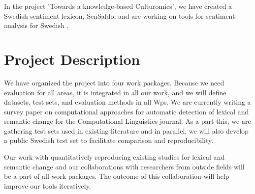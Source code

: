 \documentclass[12pt,twoside,a4paper]{article}
\begin{document}
	 
	In the project 'Towards a knowledge-based Culturomics', we have created a Swedish sentiment lexicon, SenSaldo, and are working on tools for sentiment analysis for Swedish \citep{Rouces-LREC2018}. 
	
  \vspace{-0.5cm}	 
	
	

	
	\section{Project Description}
	We have organized the project into four work packages. Because we need evaluation for all areas, it is integrated in all our work, and we will define datasets, test sets, and evaluation methods in all Wps. 
We are currently writing a survey paper on computational approaches for automatic detection of lexical and semantic change for the Computational Linguistics journal. As a part this, we are gathering test sets used in existing literature and in parallel, we will also develop a public Swedish test set to facilitate comparison and reproducibility.  

Our work with quantitatively reproducing existing studies for lexical and semantic change and our collaborations with researchers from outside fields will be a part of all work packages. The outcome of this collaboration will help improve our tools iteratively. 
	\vspace{-0.5em}
\vspace{-0.3cm}		
\end{document}
